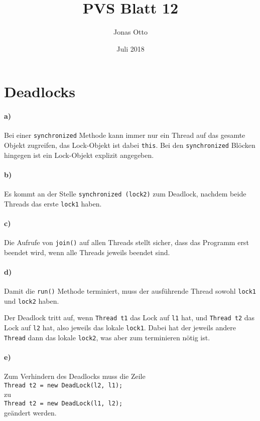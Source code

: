 \documentclass{article}
\title{PVS Blatt 12}
\author{Jonas Otto}
\date{Juli 2018}
\begin{document}
\maketitle

\setcounter{section}{2}
\section{Deadlocks}

\paragraph{a)}
Bei einer \lstinline{synchronized} Methode kann immer nur ein Thread auf das gesamte Objekt zugreifen, das Lock-Objekt ist dabei \lstinline{this}. Bei den \lstinline{synchronized} Blöcken hingegen ist ein Lock-Objekt explizit angegeben.

\paragraph{b)}
Es kommt an der Stelle \lstinline{synchronized (lock2)} zum Deadlock, nachdem beide Threads das erste \lstinline{lock1} haben.

\paragraph{c)}
Die Aufrufe von \lstinline{join()} auf allen Threads stellt sicher, dass das Programm erst beendet wird, wenn alle Threads jeweils beendet sind.

\paragraph{d)}

Damit die \lstinline{run()} Methode terminiert, muss der ausführende Thread sowohl \lstinline{lock1} und \lstinline{lock2} haben.

Der Deadlock tritt auf, wenn \lstinline{Thread t1} das Lock auf \lstinline{l1} hat, und \lstinline{Thread t2} das Lock auf \lstinline{l2} hat, also jeweils das lokale \lstinline{lock1}. Dabei hat der jeweils andere \lstinline{Thread} dann das lokale \lstinline{lock2}, was aber zum terminieren nötig ist.

\paragraph{e)}
Zum Verhindern des Deadlocks muss die Zeile \\
\lstinline{Thread t2 = new DeadLock(l2, l1);}\\
zu\\
\lstinline{Thread t2 = new DeadLock(l1, l2);}\\
geändert werden.
\end{document}
